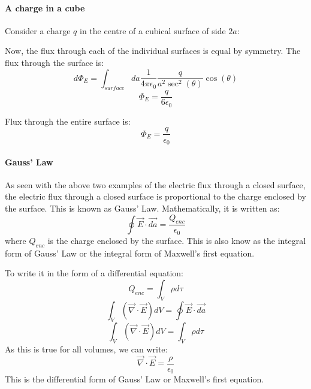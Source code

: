 \documentclass{article}
\begin{document}
\paragraph*{A charge in a cube}
Consider a charge $q$ in the centre of a cubical surface of side $2a$:\\
\begin{figure}[H]
	\centering
\end{figure}
Now, the flux through each of the individual surfaces is equal by symmetry.
The flux through the surface is:
\[d\Phi_E = \int_{surface} da \frac{1}{4\pi\epsilon_0} \frac{q}{a^2 \sec^2(\theta)} \cos(\theta) \]
\[ \Phi_E = \frac{q}{6\epsilon_0} \]

Flux through the entire surface is:
\[ \Phi_E = \frac{q}{\epsilon_0} \]

\paragraph{Gauss' Law}
As seen with the above two examples of the electric flux through a closed surface, the electric flux through a closed surface is proportional to the charge enclosed by the surface.
This is known as Gauss' Law.
Mathematically, it is written as:
\[\oint \vec{E} \cdot \vec{da} = \frac{Q_{enc}}{\epsilon_0}\]
where $Q_{enc}$ is the charge enclosed by the surface.
This is also know as the integral form of Gauss' Law or the integral form of Maxwell's first equation.

To write it in the form of a differential equation:
\[Q_{enc} = \int_{V}\rho d\tau \]
\[\int_V (\vec{\nabla} \cdot \vec{E}) dV = \oint \vec{E} \cdot \vec{da} \]
\[ \int_V (\vec{\nabla} \cdot \vec{E}) dV = \int_{V}\rho d\tau \]
As this is true for all volumes, we can write:
\[\vec{\nabla} \cdot \vec{E} = \frac{\rho}{\epsilon_0}\]
This is the differential form of Gauss' Law or Maxwell's first equation.
\end{document}
